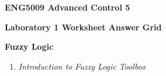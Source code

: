 \documentclass[12pt]{article}
\renewcommand{\_}{\kern-1.5pt\textunderscore\kern-1.5pt}
\begin{document}
\begin{Center}
\textbf{ENG5009 Advanced Control 5}
\end{Center}\par

\begin{Center}
\textbf{Laboratory 1 Worksheet Answer Grid}
\end{Center}\par

\textbf{Fuzzy Logic}\par

\begin{enumerate}
	\item \textit{Introduction to Fuzzy Logic Toolbox}\par






\end{enumerate}
\end{document}
